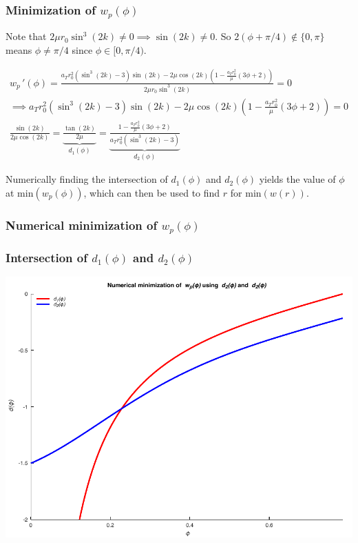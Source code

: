 \documentclass{beamer}
\begin{document}
\begin{frame}
    \frametitle{Minimization of $w_p(\phi)$}

    Note that $2\mu r_0\sin^3(2k)\neq 0\implies \sin(2k)\neq 0$. So $2(\phi+\pi/4)\not\in \{0,\pi\}$ means $\phi\neq \pi/4$ since $\phi\in [0,\pi/4)$.

    {\scriptsize\begin{gather}
        w_p\,'(\phi)=\frac{a_Tr_0^2\left(\sin^3(2k)-3\right)\sin(2k)-2\mu\cos(2k)\left(1-\frac{a_Tr_0^2}{\mu}(3\phi+2)\right)}{2\mu r_0\sin^3(2k)}=0\\
        \implies a_Tr_0^2\left(\sin^3(2k)-3\right)\sin(2k)-2\mu\cos(2k)\left(1-\frac{a_Tr_0^2}{\mu}(3\phi+2)\right)=0\\
        \frac{\sin(2k)}{2\mu\cos(2k)}=\underbrace{\frac{\tan(2k)}{2\mu}}_{d_1(\phi)}=\underbrace{\frac{1-\frac{a_Tr_0^2}{\mu}(3\phi+2)}{a_Tr_0^2(\sin^3(2k)-3)}}_{d_2(\phi)}
    \end{gather}}

    Numerically finding the intersection of $d_1(\phi)$ and $d_2(\phi)$ yields the value of $\phi$ at $\text{min}(w_p(\phi))$, which can then be used to find $r$ for $\text{min}(w(r))$.

\end{frame}

\begin{frame}
    \frametitle{Numerical minimization of $w_p(\phi)$}
\end{frame}

\begin{frame}
    \frametitle{Intersection of $d_1(\phi)$ and $d_2(\phi)$}

    \begin{center}
        \includegraphics[scale=0.7]{plots/partC_min.pdf}
    \end{center}
\end{frame}
\end{document}
